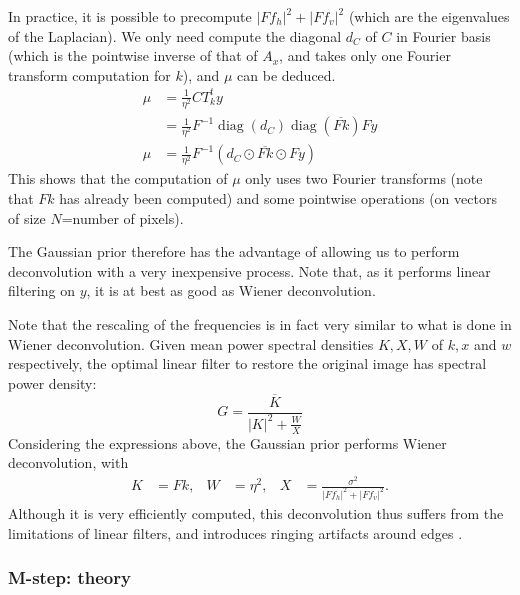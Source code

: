 \documentclass[english,a4paper]{article}
\theoremstyle{plain}
\theoremstyle{definition}
\theoremstyle{remark}
\DeclareMathOperator{\diag}{diag}
\begin{document}
In practice, it is possible to precompute $|Ff_h|^2+|Ff_v|^2$ (which are the eigenvalues of the Laplacian). We only need compute the diagonal $d_C$ of $C$ in Fourier basis (which is the pointwise inverse of that of $A_x$, and takes only one Fourier transform computation for $k$), and $\mu$ can be deduced.
\begin{align}\label{eq:mu_fourier}
\mu &= \frac{1}{\eta^2} C T_k^t y \nonumber\\
&= \frac{1}{\eta^2} F^{-1} \diag(d_C) \diag(\overline{Fk}) Fy \nonumber\\
\mu &= \frac{1}{\eta^2} F^{-1} (d_C \odot \overline{Fk} \odot Fy)
\end{align}
This shows that the computation of $\mu$ only uses two Fourier transforms (note that $Fk$ has already been computed) and some pointwise operations (on vectors of size $N$=number of pixels).

The Gaussian prior therefore has the advantage of allowing us to perform deconvolution with a very inexpensive process.
Note that, as it performs linear filtering on $y$, it is at best as good as Wiener deconvolution.

Note that the rescaling of the frequencies is in fact very similar to what is done in Wiener deconvolution. Given mean power spectral densities $K,X,W$ of $k,x$ and $w$ respectively, the optimal linear filter to restore the original image has spectral power density:
\begin{equation}\label{eq:wiener_deconv}
G = \frac{\overline{K}}{|K|^2 + \frac{W}{X}}
\end{equation}
Considering the expressions above, the Gaussian prior performs Wiener deconvolution, with 
\begin{align*}
K &= Fk,& W &= \eta^2,& X &= \frac{\sigma^2}{|Ff_h|^2+|Ff_v|^2}.
\end{align*}
Although it is very efficiently computed, this deconvolution thus suffers from the limitations of linear filters, and introduces ringing artifacts around edges \cite{shan2008high}.


\subsubsection{M-step: theory}
\end{document}
